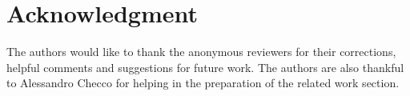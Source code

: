 \documentclass[conference]{IEEEtran}
\newcommand{\Az}[1]{{\bf{#1}}}
\begin{document}
% 




\section*{Acknowledgment}

The authors would like to thank the anonymous reviewers for their corrections, helpful comments and suggestions for future work. The authors are also thankful to Alessandro Checco for helping in the preparation of the related work section.








%
%
%




\end{document}
